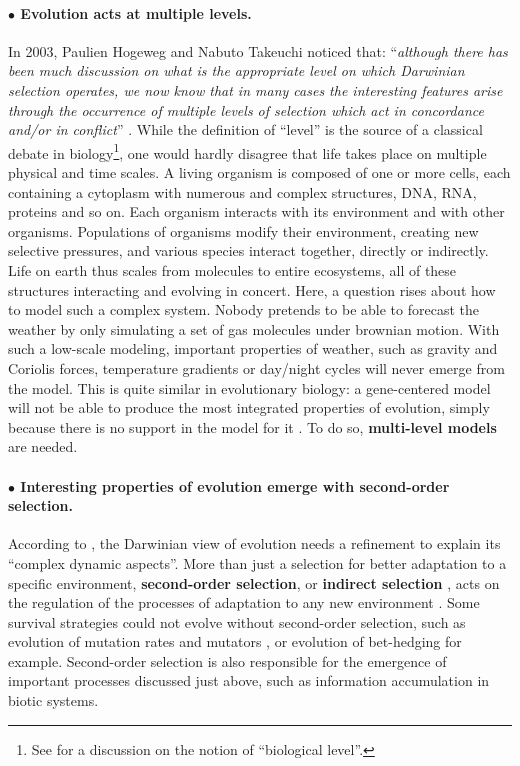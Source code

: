 \paragraph{$\bullet$ Evolution acts at multiple levels.}
In 2003, Paulien Hogeweg and Nabuto Takeuchi noticed that: ``\textit{although there has been much discussion on what is the appropriate level on which Darwinian selection operates, we now know that in many cases the interesting features arise through the occurrence of multiple levels of selection which act in concordance and/or in conflict}'' \citep{hogeweg-and-takeuchi-2003}. While the definition of ``level'' is the source of a classical debate in biology\footnote{See \cite{banzhaf-et-al-2016} for a discussion on the notion of ``biological level''.}, one would hardly disagree that life takes place on multiple physical and time scales. A living organism is composed of one or more cells, each containing a cytoplasm with numerous and complex structures, DNA, RNA, proteins and so on. Each organism interacts with its environment and with other organisms. Populations of organisms modify their environment, creating new selective pressures, and various species interact together, directly or indirectly. Life on earth thus scales from molecules to entire ecosystems, all of these structures interacting and evolving in concert. Here, a question rises about how to model such a complex system. Nobody pretends to be able to forecast the weather by only simulating a set of gas molecules under brownian motion. With such a low-scale modeling, important properties of weather, such as gravity and Coriolis forces, temperature gradients or day/night cycles will never emerge from the model. This is quite similar in evolutionary biology: a gene-centered model will not be able to produce the most integrated properties of evolution, simply because there is no support in the model for it \citep{banzhaf-et-al-2016}. To do so, \textbf{multi-level models} are needed.

\paragraph{$\bullet$ Interesting properties of evolution emerge with second-order selection.}
According to \cite{tenaillon-et-al-2001}, the Darwinian view of evolution needs a refinement to explain its ``complex dynamic aspects''. More than just a selection for better adaptation to a specific environment, \textbf{second-order selection}, or \textbf{indirect selection} \citep{kirschner-gerhart-1998,reisinger-miikkulainen-2006}, acts on the regulation of the processes of adaptation to any new environment \citep{pennisi-1998}. Some survival strategies could not evolve without second-order selection, such as evolution of mutation rates and mutators \citep{denamur-matic-2006}, or evolution of bet-hedging \citep{beaumont-et-al-2009} for example. Second-order selection is also responsible for the emergence of important processes discussed just above, such as information accumulation in biotic systems.

